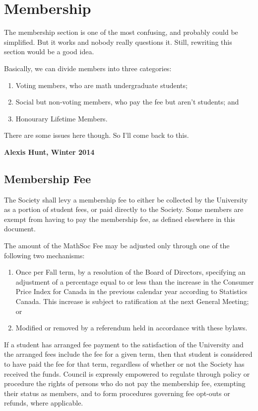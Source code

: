 \section{Membership}
\begin{annotation}
The membership section is one of the most confusing, and probably could be
simplified. But it works and nobody really questions it. Still, rewriting this
section would be a good idea.

Basically, we can divide members into three categories:
\begin{enumerate}
  \item Voting members, who are math undergraduate students;
  \item Social but non-voting members, who pay the fee but aren't students; and
  \item Honourary Lifetime Members.
\end{enumerate}
There are some issues here though. So I'll come back to this.

\textbf{Alexis Hunt, Winter 2014}
\end{annotation}

\subsection{Membership Fee}

The Society shall levy a membership fee to either be collected by the University
as a portion of student fees, or paid directly to the Society. Some members are
exempt from having to pay the membership fee, as defined elsewhere in this
document.

The amount of the MathSoc Fee may be adjusted only through one of the following two mechanisms:
\begin{enumerate}
    \item Once per Fall term, by a resolution of the Board of Directors,
        specifying an adjustment of a percentage equal to or less than the
        increase in the Consumer Price Index for Canada in the previous
        calendar year according to Statistics Canada. This increase is subject
        to ratification at the next General Meeting; or 
    \item Modified or removed by a referendum held in accordance with these
        bylaws.
\end{enumerate}

If a student has arranged fee payment to the satisfaction of the University and
the arranged fees include the fee for a given term, then that student is
considered to have paid the fee for that term, regardless of whether or not the
Society has received the funds. Council is expressly empowered to regulate through 
policy or procedure the rights of persons who do not pay the membership fee, 
exempting their status as members, and to form procedures governing fee opt-outs or 
refunds, where applicable.

